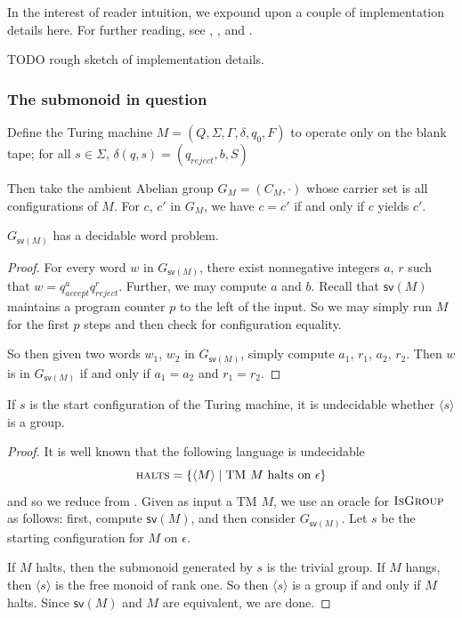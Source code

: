 \documentclass[11pt, titlepage]{article}
\begin{document}
In the interest of reader intuition, we expound upon a couple of
implementation details here. For further reading, see
\cite{davis:note_utm}, \cite{davis:defn_utm}, and
\cite{shepherdson:machine_config}.

TODO rough sketch of implementation details.

\subsubsection*{The submonoid in question}
Define the Turing machine $M = (Q, \Sigma, \Gamma, \delta, q_0, F)$ to
operate only on the blank tape; for all $s \in \Sigma$,
$\delta(q, s) = (q_{reject}, b, S)$


Then take the ambient Abelian group $G_M = (C_M, \cdot)$ whose carrier
set is all configurations of $M$. For $c$, $c'$ in $G_M$, we have
$c = c'$ if and only if $c$ yields $c'$.

\begin{proposition}
  $G_{\textsf{sv}(M)}$ has a decidable word problem.
\end{proposition}

\begin{proof}
  For every word $w$ in $G_{\textsf{sv}(M)}$, there exist nonnegative
  integers $a$, $r$ such that $w = q_{accept}^a
  q_{reject}^r$. Further, we may compute $a$ and $b$. Recall that
  $\textsf{sv}(M)$ maintains a program counter $p$ to the left of the
  input. So we may simply run $M$ for the first $p$ steps and then
  check for configuration equality.

  So then given two words $w_1$, $w_2$ in $G_{\textsf{sv}(M)}$, simply
  compute $a_1$, $r_1$, $a_2$, $r_2$. Then $w$ is in
  $G_{\textsf{sv}(M)}$ if and only if $a_1 = a_2$ and $r_1 = r_2$.
\end{proof}

\begin{proposition}
If $s$ is the start configuration of the Turing
machine, it is undecidable whether $\langle s \rangle$ is a group.
\end{proposition}

\begin{proof}
  It is well known that the following language is undecidable
  \[
    \textsc{halts} = \{\langle M \rangle \mid \text{TM $M$ halts on
      $\epsilon$} \}
  \]
  and so we reduce from . Given as input a TM $M$, we
  use an oracle for $\textsc{IsGroup}$ as follows: first, compute
  $\textsf{sv}(M)$, and then consider $G_{\textsf{sv}(M)}$. Let $s$ be
  the starting configuration for $M$ on $\epsilon$.

  If $M$ halts, then the submonoid generated by $s$ is the trivial
  group. If $M$ hangs, then $\langle s \rangle$ is the free monoid of
  rank one. So then $\langle s \rangle$ is a group if and only if $M$
  halts. Since $\textsf{sv}(M)$ and $M$ are equivalent, we are done.
\end{proof}
\end{document}
